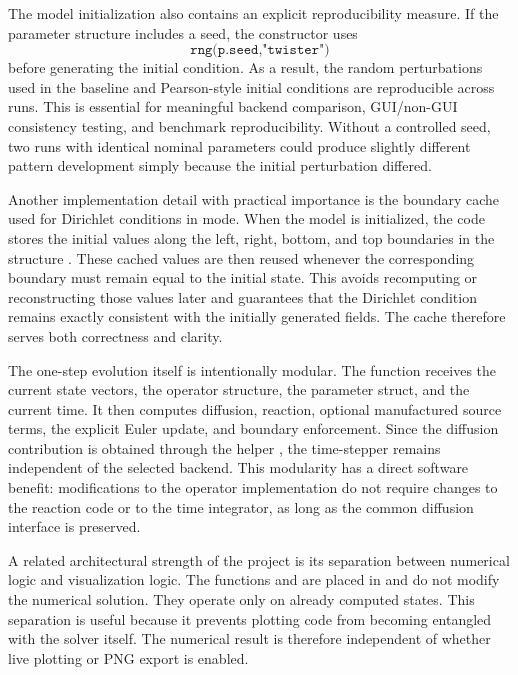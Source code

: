 The model initialization also contains an explicit reproducibility measure. If the parameter structure includes a seed, the constructor uses
\[
\texttt{rng(p.seed,"twister")}
\]
before generating the initial condition. As a result, the random perturbations used in the baseline and Pearson-style initial conditions are reproducible across runs. This is essential for meaningful backend comparison, GUI/non-GUI consistency testing, and benchmark reproducibility. Without a controlled seed, two runs with identical nominal parameters could produce slightly different pattern development simply because the initial perturbation differed.

Another implementation detail with practical importance is the boundary cache used for Dirichlet conditions in  mode. When the model is initialized, the code stores the initial values along the left, right, bottom, and top boundaries in the structure . These cached values are then reused whenever the corresponding boundary must remain equal to the initial state. This avoids recomputing or reconstructing those values later and guarantees that the Dirichlet condition remains exactly consistent with the initially generated fields. The cache therefore serves both correctness and clarity.

The one-step evolution itself is intentionally modular. The function  receives the current state vectors, the operator structure, the parameter struct, and the current time. It then computes diffusion, reaction, optional manufactured source terms, the explicit Euler update, and boundary enforcement. Since the diffusion contribution is obtained through the helper , the time-stepper remains independent of the selected backend. This modularity has a direct software benefit: modifications to the operator implementation do not require changes to the reaction code or to the time integrator, as long as the common diffusion interface is preserved.

A related architectural strength of the project is its separation between numerical logic and visualization logic. The functions  and  are placed in  and do not modify the numerical solution. They operate only on already computed states. This separation is useful because it prevents plotting code from becoming entangled with the solver itself. The numerical result is therefore independent of whether live plotting or PNG export is enabled.

